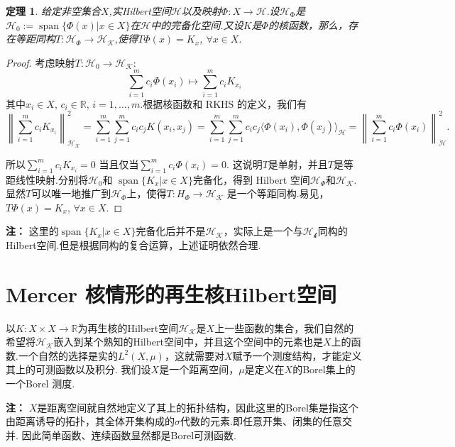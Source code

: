 \documentclass[12pt, a4paper, oneside]{ctexbook}
\newtheorem{theorem}{定理}[section]
\begin{document}
\begin{theorem}
    给定非空集合$X$,实Hilbert空间$\mathcal{H}$以及映射$\Phi:X\to \mathcal{H}.$设$\mathcal{H}_\mathrm{\Phi}$是$\mathcal{H}_{0}:=\operatorname{span}\{\Phi(x)|x\in X\}$在$\mathcal{H}$中的完备化空间.又设$K$是$\Phi$的核函数，那么，存在等距同构$T:\mathcal{H}_\Phi\to\mathcal{H_K}$,使得$T\Phi ( x) = K_x$, $\forall x\in X.$
\end{theorem}

\begin{proof}
    考虑映射$T:\mathcal{H}_0\to\mathcal{H_K}$:
    \begin{equation*}
        \sum_{i=1}^m c_i\Phi(x_i)\mapsto\sum_{i=1}^mc_iK_{x_i}
    \end{equation*}
    其中$x_i\in X$, $c_i\in \mathbb{R}$, $i= 1, \dots , m.$根据核函数和 RKHS 的定义，我们有
$$\left\|\sum_{i=1}^{m}c_{i}K_{x_{i}}\right\|_{\mathcal{H_K}}^{2}=\sum_{i=1}^{m}\sum_{j=1}^{m}c_{i}c_{j}K(x_{i},x_{j})=\sum_{i=1}^{m}\sum_{j=1}^{m}c_{i}c_{j}\langle\Phi(x_{i}),\Phi(x_{j})\rangle_{\mathcal{H}}=\left\|\sum_{i=1}^{m}c_{i}\Phi(x_{i})\right\|_{\mathcal{H}}^{2}.$$

所以$\sum_{i=1}^{m}c_{i}K_{x_{i}}=0$ 当且仅当$\sum_{i=1}^{m}c_{i}\Phi(x_{i})=0.$ 这说明$T$是单射，并且$T$是等距线性映射.分别将$\mathcal{H}_0$和 $\operatorname{span}\{K_x|x\in X\}$完备化，得到 Hilbert 空间$\mathcal{H}_\Phi$和$\mathcal{H_K}.$显然$T$可以唯一地推广到$\mathcal{H}_\Phi$上，使得$T:H_\Phi\to\mathcal{H_K}$ 是一个等距同构.易见，$T\Phi ( x) = K_x$, $\forall x\in X.$

\end{proof}
\textbf{注：} 这里的$\operatorname{span}\{K_x|x\in X\}$完备化后并不是$\mathcal{H_K}$，实际上是一个与$\mathcal{H_k}$同构的Hilbert空间.但是根据同构的复合运算，上述证明依然合理.


\section{Mercer 核情形的再生核Hilbert空间}
以$K:X\times X \to \mathbb{R}$为再生核的Hilbert空间$\mathcal{H_K}$是$X$上一些函数的集合，我们自然的希望将$\mathcal{H_K}$嵌入到某个熟知的Hilbert空间中，并且这个空间中的元素也是$X$上的函数.一个自然的选择是实的$L^2(X,\mu)$，这就需要对$X$赋予一个测度结构，才能定义其上的可测函数以及积分. 我们设$X$是一个距离空间，$\mu$是定义在$X$的Borel集上的一个Borel 测度.

\textbf{注：} $X$是距离空间就自然地定义了其上的拓扑结构，因此这里的Borel集是指这个由距离诱导的拓扑，其全体开集构成的$\sigma$代数的元素.即任意开集、闭集的任意交并. 因此简单函数、连续函数显然都是Borel可测函数.
\end{document}
